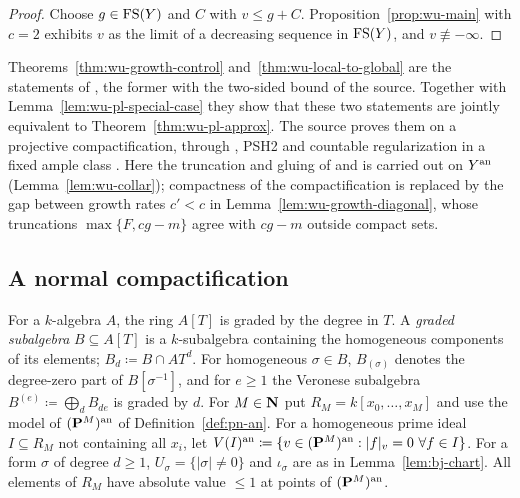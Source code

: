 \begin{proof}
Choose $g\in\mathrm{FS}(Y)$ and $C$ with $v\le g+C$. Proposition~\ref{prop:wu-main} with $c=2$ exhibits $v$ as the limit
of a decreasing sequence in $\mathrm{FS}(Y)$, and $v\not\equiv-\infty$.
\end{proof}

\begin{remark}\label{rmk:wu-affine}
Theorems~\ref{thm:wu-growth-control} and~\ref{thm:wu-local-to-global} are the statements of
\cite[Lemma~5.11(5),(6)]{FHX}, the former with the two-sided bound of the source. Together with
Lemma~\ref{lem:wu-pl-special-case} they show that these two statements are jointly equivalent to
Theorem~\ref{thm:wu-pl-approx}. The source proves them on a projective compactification, through
\cite[Lemma~5.10]{FHX}, PSH2 \cite[Theorem~4.5]{BJ22} and countable regularization in a fixed ample class
\cite[Corollary~12.18(iii)]{BJ22}. Here the truncation and gluing of \cite[Lemma~5.10(2)]{FHX} and
\cite[Lemma~3.24(3)]{Wu26} is carried out on $Y^{\mathrm{an}}$ (Lemma~\ref{lem:wu-collar}); compactness of the
compactification is replaced by the gap between growth rates $c'<c$ in Lemma~\ref{lem:wu-growth-diagonal}, whose
truncations $\max\{F,cg-m\}$ agree with $cg-m$ outside compact sets.
\end{remark}

\subsection{A normal compactification}\label{subsec:wu-compactification}

\begin{convention}\label{conv:wu-graded}
\leanok
{}
For a $k$-algebra $A$, the ring $A[T]$ is graded by the degree in $T$. A \emph{graded subalgebra} $B\subseteq A[T]$
is a $k$-subalgebra containing the homogeneous components of its elements; $B_d\coloneqq B\cap AT^d$. For
homogeneous $\sigma\in B$, $B_{(\sigma)}$ denotes the degree-zero part of $B[\sigma^{-1}]$, and for $e\ge1$ the
Veronese subalgebra $B^{(e)}\coloneqq\bigoplus_dB_{de}$ is graded by $d$. For $M\in\mathbf{N}$ put $R_M=k[x_0,\dots,x_M]$
and use the model of $(\mathbf{P}^M)^{\mathrm{an}}$ of Definition~\ref{def:pn-an}. For a homogeneous prime ideal $I\subseteq R_M$
not containing all $x_i$, let $V(I)^{\mathrm{an}}\coloneqq\{v\in(\mathbf{P}^M)^{\mathrm{an}}:|f|_v=0\ \forall f\in I\}$. For a form $\sigma$
of degree $d\ge1$, $U_\sigma=\{|\sigma|\ne0\}$ and $\iota_\sigma$ are as in Lemma~\ref{lem:bj-chart}. All
elements of $R_M$ have absolute value $\le1$ at points of $(\mathbf{P}^M)^{\mathrm{an}}$.
\end{convention}


